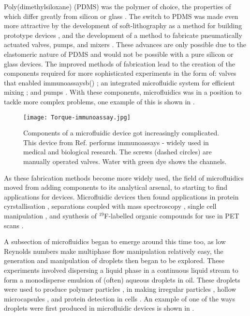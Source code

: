 Poly(dimethylsiloxane) (PDMS) was the polymer of choice, the properties of which differ greatly
from silicon or glass \citep{ng2002components,whitesides2001flexible}. The switch to PDMS was made even
more attractive by the development of soft-lithography as a method for building prototype
devices \citep{mcdonald2000fabrication}, and the development of a method to fabricate pneumatically actuated valves,
pumps, and mixers \citep{mcdonald2000fabrication}. These advances are only possible due to the elastomeric nature of PDMS
and would not be possible with a pure silicon or glass devices.
The improved methods of fabrication lead to the creation of the components required for more sophisticated
experiments in the form of: valves that enabled immunoassaysb() \citep{weibel2005torque}; an integrated
microfluidic system for efficient mixing \citep{gunther2005micromixing}; and pumps \citep{laser2004review}.
With these components, microfluidics was in a position to tackle more complex problems, one example of this is shown in .


\begin{figure}
  \begin{center}
  \texttt{[image: Torque-immunoassay.jpg]}
  \end{center}
  \caption{Components of a microfluidic device got increasingly complicated. This device from Ref.\citep{weibel2005torque} performs
  immunoassays - widely used in medical and biological research. The screws (dashed circles) are manually operated valves. Water with green dye
  shows the channels.}
  \label{fig:immunoassay}
\end{figure}


As these fabrication methods become more widely used, the field of microfluidics moved from
adding components to its analytical arsenal, to starting to find applications for devices.
Microfluidic devices then found applications in protein cyrstallisation \citep{hansen2002robust},
separations coupled with mass spectroscopy \citep{ramsey1997generating}, single cell manipulation \citep{wheeler2003microfluidic},
and synthesis of $^{19}$F-labelled organic compounds for use in PET scans \citep{lee2005multistep}.

A subsection of microfluidics began to emerge around this time too, as
low Reynolds numbers make multiphase flow manipulation
relatively easy, the generation and manipulation of droplets \citep{thorsen2001dynamic,
link2004geometrically, tan2004design} then began to be explored.
These experiments involved dispersing a liquid phase in a continuous
liquid stream to form a monodisperse emulsion of (often) aqueous droplets in oil.
These droplets were used to produce polymer particles \citep{nie2005polymer},
in making irregular particles \citep{nisisako2007formation}, hollow microcapsules
\citep{utada2005monodisperse}, and protein detection in cells
\citep{huebner2007quantitative}. An example of one of the ways droplets were first
produced in microfluidic devices is shown in .

